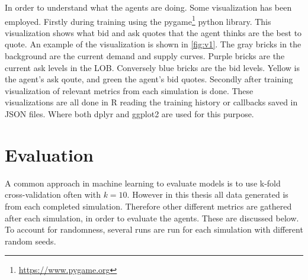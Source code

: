 \documentclass{kththesis}
\theoremstyle{definition}
\begin{document}
In order to understand what the agents are doing. Some visualization has been employed. Firstly during training using the pygame\footnote{\url{https://www.pygame.org}} python library. This visualization shows what bid and ask quotes that the agent thinks are the best to quote. An example of the visualization is shown in \autoref{fig:v1}. The gray bricks in the background are the current demand and supply curves. Purple bricks are the current ask levels in the LOB. Conversely blue bricks are the bid levels. Yellow is the agent's ask qoute, and green the agent's bid quotes. Secondly after training visualization of relevant metrics from each simulation is done. 
\newpage
These visualizations are all done in R reading the training history or callbacks saved in JSON files. Where both dplyr \parencite{dplyr} and ggplot2 \parencite{ggfplot2} are used for this purpose.

\section{Evaluation}
A common approach in machine learning to evaluate models is to use k-fold cross-validation often with $k=10$. However in this thesis all data generated is from each completed simulation. Therefore other different metrics are gathered after each simulation, in order to evaluate the agents. These are discussed below. To account for randomness, several runs are run for each simulation with different random seeds. 
\end{document}
